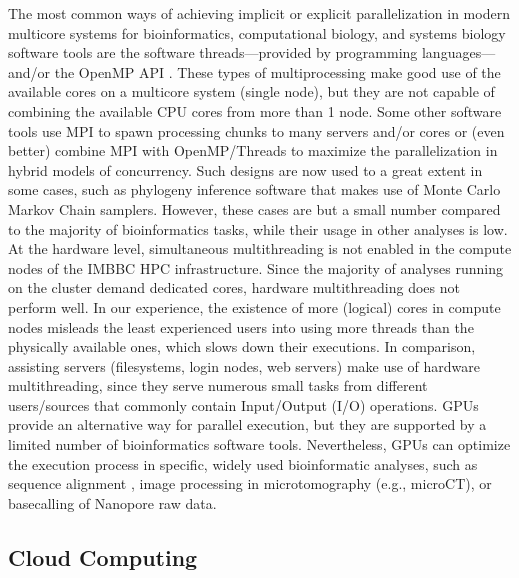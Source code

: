    The most common ways of achieving implicit or explicit parallelization in modern multicore systems for bioinformatics, computational biology, and systems biology software tools are the software threads—provided by programming languages—and/or the OpenMP API \citep{dagum1998openmp}. 
   These types of multiprocessing make good use of the available cores on a multicore system (single node), but they are not capable of combining the available CPU cores from more than 1 node. 
   Some other software tools use MPI to spawn processing chunks to many servers and/or cores or (even better) combine MPI with OpenMP/Threads to maximize the parallelization in hybrid models of concurrency. 
   Such designs are now used to a great extent in some cases, such as phylogeny inference software that makes use of Monte Carlo Markov Chain samplers.
   However, these cases are but a small number compared to the majority of bioinformatics tasks, while their usage in other analyses is low. At the hardware level, simultaneous multithreading is not enabled in the compute nodes of the IMBBC HPC infrastructure. 
   Since the majority of analyses running on the cluster demand dedicated cores, hardware multithreading does not perform well. 
   In our experience, the existence of more (logical) cores in compute nodes misleads the least experienced users into using more threads than the physically available ones, which slows down their executions. 
   In comparison, assisting servers (filesystems, login nodes, web servers) make use of hardware multithreading, since they serve numerous small tasks from different users/sources that commonly contain Input/Output (I/O) operations. 
   GPUs provide an alternative way for parallel execution, but they are supported by a limited number of bioinformatics software tools. Nevertheless, GPUs can optimize the execution process in specific, widely used bioinformatic analyses, such as sequence alignment \citep{vouzis2011gpu, nobile2017graphics}, image processing in microtomography (e.g., microCT), or basecalling of Nanopore raw data.



   \subsection*{Cloud Computing}

